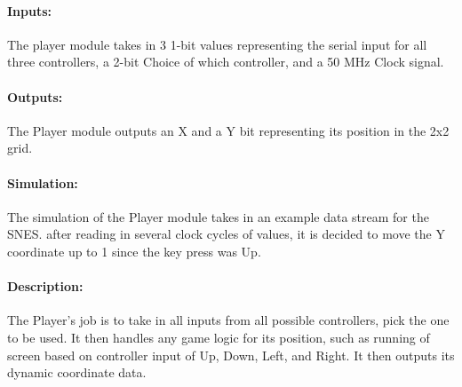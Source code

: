 \documentclass[]{article}
\begin{document}
\paragraph{Inputs:} The player module takes in 3 1-bit values representing the serial input for all three controllers, a 2-bit Choice of which controller, and a 50 MHz Clock signal.
\paragraph{Outputs:} The Player module outputs an X and a Y bit representing its position in the 2x2 grid.
\paragraph{Simulation:} The simulation of the Player module takes in an example data stream for the SNES.
after reading in several clock cycles of values, it is decided to move the Y coordinate up to 1 since the key press was Up.
\paragraph{Description:} The Player's job is to take in all inputs from all possible controllers, pick the one to be used. It then handles any game logic for its position,
such as running of screen based on controller input of Up, Down, Left, and Right. It then outputs its dynamic coordinate data.
\end{document}
